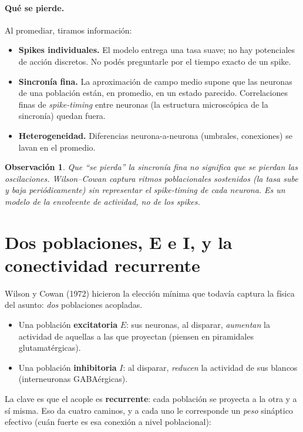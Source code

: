 \documentclass[11pt,a4paper]{article}
\newtheorem{remark}{Observación}
\begin{document}
\paragraph{Qué se pierde.} Al promediar, tiramos información:
\begin{itemize}[leftmargin=1.4em,itemsep=2pt]
  \item \textbf{Spikes individuales.} El modelo entrega una tasa suave; no hay potenciales de acción discretos. No podés preguntarle por el tiempo exacto de un spike.
  \item \textbf{Sincronía fina.} La aproximación de campo medio supone que las neuronas de una población están, en promedio, en un estado parecido. Correlaciones finas de \emph{spike-timing} entre neuronas (la estructura microscópica de la sincronía) quedan fuera.
  \item \textbf{Heterogeneidad.} Diferencias neurona-a-neurona (umbrales, conexiones) se lavan en el promedio.
\end{itemize}

\begin{remark}
Que ``se pierda'' la sincronía fina no significa que se pierdan las \emph{oscilaciones}. Wilson--Cowan captura ritmos poblacionales sostenidos (la tasa sube y baja periódicamente) sin representar el spike-timing de cada neurona. Es un modelo de la \emph{envolvente} de actividad, no de los spikes.
\end{remark}


\section{Dos poblaciones, E e I, y la conectividad recurrente}

Wilson y Cowan (1972) hicieron la elección mínima que todavía captura la física del asunto: \emph{dos} poblaciones acopladas.

\begin{itemize}[leftmargin=1.4em,itemsep=2pt]
  \item Una población \textbf{excitatoria} $E$: sus neuronas, al disparar, \emph{aumentan} la actividad de aquellas a las que proyectan (piensen en piramidales glutamatérgicas).
  \item Una población \textbf{inhibitoria} $I$: al disparar, \emph{reducen} la actividad de sus blancos (interneuronas GABAérgicas).
\end{itemize}

La clave es que el acople es \textbf{recurrente}: cada población se proyecta a la otra y a sí misma. Eso da cuatro caminos, y a cada uno le corresponde un \emph{peso} sináptico efectivo (cuán fuerte es esa conexión a nivel poblacional):
\end{document}
